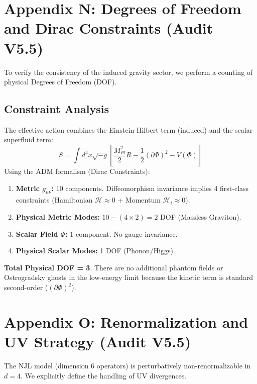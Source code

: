 \documentclass[a4paper,12pt]{article}
\begin{document}
\section{Appendix N: Degrees of Freedom and Dirac Constraints (Audit V5.5)}

To verify the consistency of the induced gravity sector, we perform a counting of physical Degrees of Freedom (DOF).

\subsection{Constraint Analysis}
The effective action combines the Einstein-Hilbert term (induced) and the scalar superfluid term:
\begin{equation}
    S = \int d^4x \sqrt{-g} \left[ \frac{M_{Pl}^2}{2} R - \frac{1}{2}(\partial \Phi)^2 - V(\Phi) \right]
\end{equation}
Using the ADM formalism (Dirac Constraints):
\begin{enumerate}
    \item \textbf{Metric $g_{\mu\nu}$:} 10 components. Diffeomorphism invariance implies 4 first-class constraints (Hamiltonian $\mathcal{H} \approx 0$ + Momentum $\mathcal{H}_i \approx 0$).
    \item \textbf{Physical Metric Modes:} $10 - (4 \times 2) = 2$ DOF (Massless Graviton).
    \item \textbf{Scalar Field $\Phi$:} 1 component. No gauge invariance.
    \item \textbf{Physical Scalar Modes:} 1 DOF (Phonon/Higgs).
\end{enumerate}
\textbf{Total Physical DOF = 3}.
There are no additional phantom fields or Ostrogradsky ghosts in the low-energy limit because the kinetic term is standard second-order ($(\partial \Phi)^2$).

\section{Appendix O: Renormalization and UV Strategy (Audit V5.5)}

The NJL model (dimension 6 operators) is perturbatively non-renormalizable in $d=4$. We explicitly define the handling of UV divergences.
\end{document}
